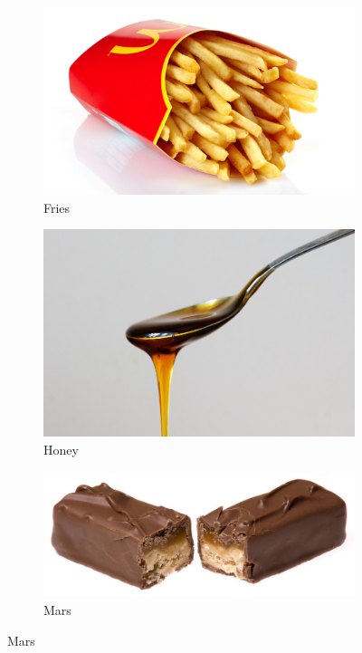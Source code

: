 \documentclass[a4paper,doc,natbib]{apa6}
\begin{document}
\begin{figure}[h!]
\begin{subfigure}[b]{0.32\textwidth}
 \end{subfigure}
\begin{subfigure}[b]{0.32\textwidth}
 \caption{Fries}
\includegraphics[width=0.95\linewidth]{Images/fries.png}
 \end{subfigure} 
 \begin{subfigure}[b]{0.32\textwidth}
 \caption{Honey}
\includegraphics[width=0.95\linewidth]{Images/honey.jpg}
 \end{subfigure} 
  \begin{subfigure}[b]{0.32\textwidth}
 \caption{Mars}
\includegraphics[width=0.95\linewidth]{Images/mars.jpg}

\end{subfigure}
\end{figure}
\end{document}
